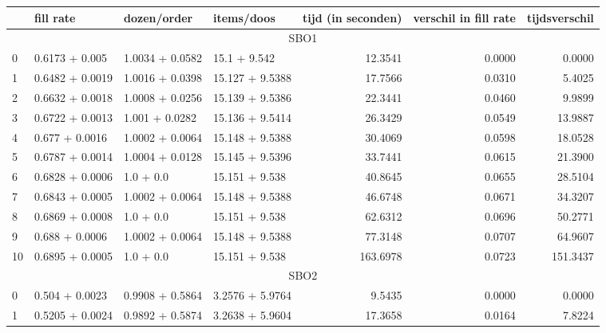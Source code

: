 \begin{tabular}{llllrrr}
  \toprule
  {} &        fill rate &      dozen/order &       items/doos &  tijd (in seconden) &  verschil in fill rate &  tijdsverschil \\
  \midrule
  \multicolumn{7}{c}{SBO1} \\
  \midrule
  0  &   0.6173 + 0.005 &  1.0034 + 0.0582 &     15.1 + 9.542 &             12.3541 &                 0.0000 &         0.0000 \\
  1  &  0.6482 + 0.0019 &  1.0016 + 0.0398 &  15.127 + 9.5388 &             17.7566 &                 0.0310 &         5.4025 \\
  2  &  0.6632 + 0.0018 &  1.0008 + 0.0256 &  15.139 + 9.5386 &             22.3441 &                 0.0460 &         9.9899 \\
  3  &  0.6722 + 0.0013 &   1.001 + 0.0282 &  15.136 + 9.5414 &             26.3429 &                 0.0549 &        13.9887 \\
  4  &   0.677 + 0.0016 &  1.0002 + 0.0064 &  15.148 + 9.5388 &             30.4069 &                 0.0598 &        18.0528 \\
  5  &  0.6787 + 0.0014 &  1.0004 + 0.0128 &  15.145 + 9.5396 &             33.7441 &                 0.0615 &        21.3900 \\
  6  &  0.6828 + 0.0006 &        1.0 + 0.0 &   15.151 + 9.538 &             40.8645 &                 0.0655 &        28.5104 \\
  7  &  0.6843 + 0.0005 &  1.0002 + 0.0064 &  15.148 + 9.5388 &             46.6748 &                 0.0671 &        34.3207 \\
  8  &  0.6869 + 0.0008 &        1.0 + 0.0 &   15.151 + 9.538 &             62.6312 &                 0.0696 &        50.2771 \\
  9  &   0.688 + 0.0006 &  1.0002 + 0.0064 &  15.148 + 9.5388 &             77.3148 &                 0.0707 &        64.9607 \\
  10 &  0.6895 + 0.0005 &        1.0 + 0.0 &   15.151 + 9.538 &            163.6978 &                 0.0723 &       151.3437 \\
  \midrule
  \multicolumn{7}{c}{SBO2} \\
  \midrule
  0  &   0.504 + 0.0023 &  0.9908 + 0.5864 &  3.2576 + 5.9764 &              9.5435 &                 0.0000 &         0.0000 \\
  1  &  0.5205 + 0.0024 &  0.9892 + 0.5874 &  3.2638 + 5.9604 &             17.3658 &                 0.0164 &         7.8224 \\

\end{tabular}
